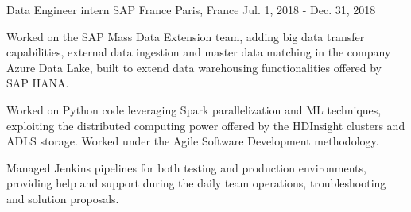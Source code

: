 

\begin{cventries}

  \cventry
    {Data Engineer intern} %
    {SAP France} %
    {Paris, France} %
    {Jul. 1, 2018 - Dec. 31, 2018} %
    {
      \begin{cvitems} %
        \item {Worked on the SAP Mass Data Extension team, adding big data transfer capabilities, external data ingestion and master data matching in the company Azure Data Lake, built to extend data warehousing functionalities offered by SAP HANA.}
        \item {Worked on Python code leveraging Spark parallelization and ML techniques, exploiting the distributed computing power offered by the HDInsight clusters and ADLS storage. Worked under the Agile Software Development methodology.}
        \item {Managed Jenkins pipelines for both testing and production environments, providing help and support during the daily team operations, troubleshooting and solution proposals.}
      \end{cvitems}
    }
\end{cventries}
